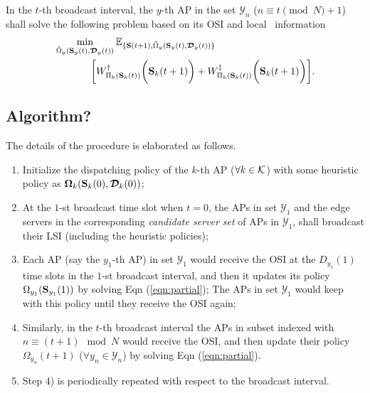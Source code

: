 \begin{problem}[]
    In the $t$-th broadcast interval, the $y$-th AP in the set $\mathcal{Y}_{n}$ ($n \equiv t \pmod{N} + 1$) shall solve the following problem based on its OSI and local \brlatency~information
    {\small
    \begin{align}
        &\min_{\tilde{\Omega}_{y}(\mathbf{S}_{y}(t),\boldsymbol{\mathcal{D}}_{y}(t))}
        \mathbb{E}_{\{\mathbf{S}(t+1), \tilde{\Omega}_{y}(\mathbf{S}_{y}(t),\boldsymbol{\mathcal{D}}_{y}(t))\}}
        \nonumber\\
        &~~~~~~~~~~~\bigg[
            W^{\dagger}_{ \Pi_{k}(\mathbf{S}_{k}(t)) }\bigg(\mathbf{S}_{k}(t+1)\bigg) +
            W^{\ddagger}_{ \Pi_{k}(\mathbf{S}_{k}(t)) }\bigg(\mathbf{S}_{k}(t+1)\bigg)
        \bigg].
        \label{eqn:partial}
    \end{align}
    }
    \label{problem_3}
\end{problem}


\subsection{Algorithm?}
The details of the procedure is elaborated as follows.
\begin{enumerate}
    \item Initialize the dispatching policy of the $k$-th AP ($\forall k\in\mathcal{K}$) with some heuristic policy as $\boldsymbol{\Omega}_{k}(\mathbf{S}_{k}(0), \boldsymbol{\mathcal{D}}_{k}(0))$;
    \item At the $1$-st broadcast time slot when $t=0$, the APs in set $\mathcal{Y}_{1}$ and the edge servers in the corresponding \emph{candidate server set} of APs in $\mathcal{Y}_{1}$, shall broadcast their LSI (including the heuristic policies);
    \item Each AP (say the $y_1$-th AP) in set $\mathcal{Y}_{1}$ would receive the OSI at the $D_{y_1}(1)$ time slots in the $1$-st broadcast interval, and then it updates its policy $\Omega_{y_1}(\mathbf{S}_{y_1}(1))$ by solving Eqn (\ref{eqn:partial}); The APs in set $\mathcal{Y}_{1}$ would keep with this policy until they receive the OSI again;
    \item Similarly, in the $t$-th broadcast interval the APs in subset indexed with $n \equiv (t + 1)\mod{N}$ would receive the OSI, and then update their policy $\Omega_{y_n}(t+1)$ ($\forall y_n\in\mathcal{Y}_{n}$) by solving Eqn (\ref{eqn:partial}).
    \item Step 4) is periodically repeated with respect to the broadcast interval.
\end{enumerate}

